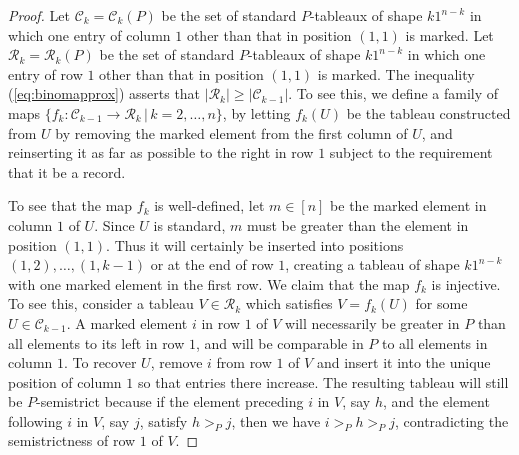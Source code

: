 \documentclass[12pt]{amsart}
\numberwithin{equation}{section}
\begin{document}
\begin{proof}
  Let $\mathcal C_k = \mathcal C_k(P)$
  be the set of standard $P$-tableaux of shape
  $k 1^{n-k}$ in which one entry of column $1$
  other than that in position $(1,1)$ is marked.
  Let $\mathcal R_k = \mathcal R_k(P)$
  be the set of standard $P$-tableaux of shape
  $k 1^{n-k}$ in which one entry of row $1$
  other than that in position $(1,1)$ is marked.
  The inequality (\ref{eq:binomapprox}) asserts that
  $|\mathcal R_k| \geq |\mathcal C_{k-1}|$.
  To see this, we define a family of maps
  $\{f_k: \mathcal C_{k-1} \rightarrow \mathcal R_k \,|\, k = 2,\dotsc, n\}$,
  by letting
  $f_k(U)$ be the tableau constructed from $U$ by
  removing the marked element from the first column of $U$,
  and reinserting it as far as possible to the right in row $1$
  subject to the requirement that it be a record.

  To see that the map $f_k$ is well-defined,
  let $m \in [n]$ be the marked element in column $1$ of $U$.
  Since $U$ is standard,
  $m$ must be greater than the element in position $(1,1)$.
  Thus it will certainly be inserted into positions $(1,2), \dotsc, (1,k-1)$
  or at the end of row $1$, creating a tableau of shape $k1^{n-k}$ with
  one marked element in the first row.
  We claim that the map $f_k$ is injective.
  To see this,
  consider a tableau $V \in \mathcal R_{k}$
  which satisfies $V = f_k(U)$ for some $U \in \mathcal C_{k-1}$.
  A marked element $i$ in row $1$ of $V$ will necessarily be greater in $P$
  than all elements to its left in row $1$, and will be comparable in $P$
  to all elements in column $1$.
  To recover $U$, remove $i$ from row $1$ of $V$
  and insert it into the unique position of column $1$ so that entries there
  increase.  The resulting tableau will still be $P$-semistrict
  because if the element preceding $i$ in $V$, say $h$,
  and the element following $i$ in $V$, say $j$,
  satisfy $h >_P j$, then we have $i >_P h >_P j$, contradicting
  the semistrictness of row $1$ of $V$.
  

\end{proof}
\end{document}
